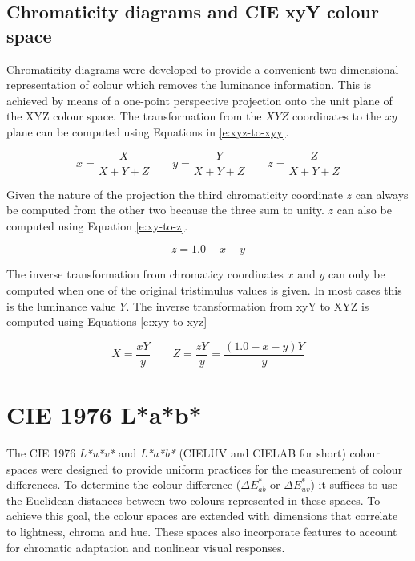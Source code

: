 \subsection{Chromaticity diagrams and CIE xyY colour space}

Chromaticity diagrams were developed to provide a convenient
two-dimensional representation of colour which removes the luminance
information. This is achieved by means of a one-point perspective
projection onto the unit plane of the XYZ colour space. The
transformation from the $XYZ$ coordinates to the $xy$ plane can be
computed using Equations in \ref{e:xyz-to-xyy}.

\begin{equation}
x = \frac{X}{X + Y + Z} \qquad
y = \frac{Y}{X + Y + Z} \qquad
z = \frac{Z}{X + Y + Z}
\label{e:xyz-to-xyy}
\end{equation}

Given the nature of the projection the third chromaticity coordinate
$z$ can always be computed from the other two because the three sum
to unity. $z$ can also be computed using Equation \ref{e:xy-to-z}.

\begin{equation}
z = 1.0 - x - y
\label{e:xy-to-z}
\end{equation}

The inverse transformation from chromaticy coordinates $x$ and $y$ can
only be computed when one of the original tristimulus values is
given. In most cases this is the luminance value $Y$. The inverse
transformation from xyY to XYZ is computed using Equations
\ref{e:xyy-to-xyz}

\begin{equation}
X = \frac{xY}{y} \qquad
Z = \frac{zY}{y} =  \frac{(1.0-x-y)Y}{y}
\label{e:xyy-to-xyz}
\end{equation}

\section{CIE 1976 L*a*b*}
\label{s:lab}


The CIE 1976 \emph{L*u*v*} and \emph{L*a*b*} (CIELUV and CIELAB for
short) colour spaces were designed to provide uniform practices for
the measurement of colour differences. To determine the colour
difference ($\Delta E^*_{ab}$ or $\Delta E^*_{uv}$) it suffices to use
the Euclidean distances between two colours represented in these
spaces. To achieve this goal, the colour spaces are extended with
dimensions that correlate to lightness, chroma and hue. These spaces
also incorporate features to account for chromatic adaptation and
nonlinear visual responses.

